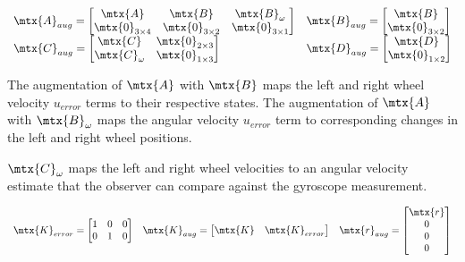 \begin{equation}
  \begin{array}{ll}
    \mtx{A}_{aug} =
    \begin{bmatrix}
      \mtx{A} & \mtx{B} & \mtx{B}_{\omega} \\
      \mtx{0}_{3 \times 4} & \mtx{0}_{3 \times 2} & \mtx{0}_{3 \times 1}
    \end{bmatrix} &
    \mtx{B}_{aug} =
    \begin{bmatrix}
      \mtx{B} \\
      \mtx{0}_{3 \times 2}
    \end{bmatrix} \\
    \mtx{C}_{aug} =
    \begin{bmatrix}
      \mtx{C} & \mtx{0}_{2 \times 3} \\
      \mtx{C}_{\omega} & \mtx{0}_{1 \times 3}
    \end{bmatrix} &
    \mtx{D}_{aug} =
    \begin{bmatrix}
      \mtx{D} \\
      \mtx{0}_{1 \times 2}
    \end{bmatrix}
  \end{array}
\end{equation}

The augmentation of $\mtx{A}$ with $\mtx{B}$ maps the left and right wheel
velocity $u_{error}$ terms to their respective states. The augmentation of
$\mtx{A}$ with $\mtx{B}_{\omega}$ maps the angular velocity $u_{error}$ term to
corresponding changes in the left and right wheel positions.

$\mtx{C}_{\omega}$ maps the left and right wheel velocities to an angular
velocity estimate that the \gls{observer} can compare against the gyroscope
measurement.

\begin{equation}
  \begin{array}{ccc}
    \mtx{K}_{error} =
    \begin{bmatrix}
      1 & 0 & 0 \\
      0 & 1 & 0
    \end{bmatrix} &
    \mtx{K}_{aug} = \begin{bmatrix}
      \mtx{K} & \mtx{K}_{error}
    \end{bmatrix} &
    \mtx{r}_{aug} = \begin{bmatrix}
      \mtx{r} \\
      0 \\
      0 \\
      0
    \end{bmatrix}
  \end{array}
\end{equation}

